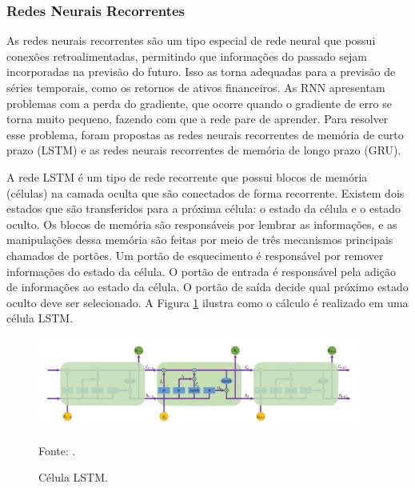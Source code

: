         \subsubsection{Redes Neurais Recorrentes}
        
            \ipar As redes neurais recorrentes são um tipo especial de rede neural que possui conexões retroalimentadas, permitindo que informações do passado sejam incorporadas na previsão do futuro. Isso as torna adequadas para a previsão de séries temporais, como os retornos de ativos financeiros. As \acrshort{RNN} apresentam problemas com a perda do gradiente, que ocorre quando o gradiente de erro se torna muito pequeno, fazendo com que a rede pare de aprender. Para resolver esse problema, foram propostas as redes neurais recorrentes de memória de curto prazo (\acrshort{LSTM}) e as redes neurais recorrentes de memória de longo prazo (\acrshort{GRU}).

            \ipar A rede \acrshort{LSTM} é um tipo de rede recorrente que possui blocos de memória (células) na camada oculta que são conectados de forma recorrente. Existem dois estados que são transferidos para a próxima célula: o estado da célula e o estado oculto. Os blocos de memória são responsáveis por lembrar as informações, e as manipulações dessa memória são feitas por meio de três mecanismos principais chamados de portões. Um portão de esquecimento é responsável por remover informações do estado da célula. O portão de entrada é responsável pela adição de informações ao estado da célula. O portão de saída decide qual próximo estado oculto deve ser selecionado. A Figura \ref{fig:lstm} ilustra como o cálculo é realizado em uma célula \acrshort{LSTM}.

            \begin{figure}[H]
                \centering
                \caption{Célula LSTM.}
                \label{fig:lstm}
                \includegraphics[width=0.95\textwidth]{imagens/lstm.png}
                \par \footnotesize Fonte: .
            \end{figure}


